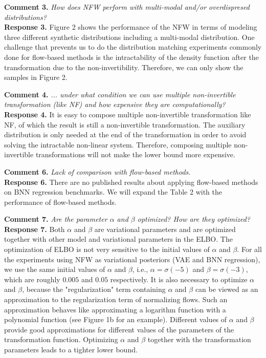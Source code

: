 \documentclass{article}
\begin{document}
\textbf{Comment 3.} \textit{How does NFW perform with multi-modal and/or overdispresed distributions?}\\
\textbf{Response 3.} Figure 2 shows the performance of the NFW in terms of modeling three different synthetic distributions including a multi-modal distribution. One challenge that prevents us to do the distribution matching experiments commonly done for flow-based methods is the intractability of the density function after the transformation due to the non-invertibility. Therefore, we can only show the samples in Figure 2. 

\textbf{Comment 4.} \textit{... under what condition we can use multiple non-invertible transformation (like NF) and how expensive they are computationally?}\\
\textbf{Response 4.} It is easy to compose multiple non-invertible transformation like NF, of which the result is still a non-invertible transformation. The auxiliary distribution is only needed at the end of the transformation in order to avoid solving the intractable non-linear system. Therefore, composing multiple non-invertible transformations will not make the lower bound more expensive.

\textbf{Comment 6.} \textit{Lack of comparison with flow-based methods.}\\
\textbf{Response 6.} There are no published results about applying flow-based methods on BNN regression benchmarks. We will expand the Table 2 with the performance of flow-based methods. %

\textbf{Comment 7.} \textit{Are the parameter $\alpha$ and $\beta$ optimized? How are they optimized?}\\
\textbf{Response 7.} Both $\alpha$ and $\beta$ are variational parameters and are optimized together with other model and variational parameters in the ELBO. The optimization of ELBO is not very sensitive to the initial values of $\alpha$ and $\beta$. For all the experiments using NFW as variational posteriors (VAE and BNN regression), we use the same initial values of $\alpha$ and $\beta$, i.e., $\alpha=\sigma(-5)$ and $\beta=\sigma(-3)$, which are roughly $0.005$ and $0.05$ respectively. It is also necessary to optimize $\alpha$ and $\beta$, because the "regularization" term containing $\alpha$ and $\beta$ can be viewed as an approximation to the regularization term of normalizing flows. Such an approximation behaves like approximating a logarithm function with a polynomial function (see Figure 1b for an example). Different values of $\alpha$ and $\beta$ provide good approximations for different values of the parameters of the transformation function. Optimizing $\alpha$ and $\beta$ together with the transformation parameters leads to a tighter lower bound.
\end{document}
